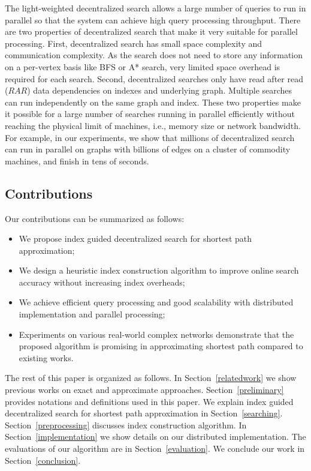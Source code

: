 The light-weighted decentralized search allows a large number of queries to run in parallel so that the system can achieve high query processing throughput. There are two properties of decentralized search that make it very suitable for parallel processing. First, decentralized search has small space complexity and communication complexity. As the search does not need to store any information on a per-vertex basis like BFS or A* search, very limited space overhead is required for each search. Second, decentralized searches only have read after read ($RAR$) data dependencies on indexes and underlying graph. Multiple searches can run independently on the same graph and index. These two properties make it possible for a large number of searches running in parallel efficiently without reaching the physical limit of machines, i.e., memory size or network bandwidth. For example, in our experiments, we show that millions of decentralized search can run in parallel on graphs with billions of edges on a cluster of commodity machines, and finish in tens of seconds.

\subsection{Contributions}
Our contributions can be summarized as follows:

\begin{itemize}
	\item We propose index guided decentralized search for shortest path approximation;
	\item We design a heuristic index construction algorithm to improve online search accuracy without increasing index overheads;
	\item We achieve efficient query processing and good scalability with distributed implementation and parallel processing;
	\item Experiments on various real-world complex networks demonstrate that the proposed algorithm is promising in approximating shortest path compared to existing works.
\end{itemize}

The rest of this paper is organized as follows. In Section~\ref{relatedwork} we show previous works on exact and approximate approaches. Section~\ref{preliminary} provides notations and definitions used in this paper. We explain index guided decentralized search for shortest path approximation in Section~\ref{searching}. Section~\ref{preprocessing} discusses index construction algorithm. In Section~\ref{implementation} we show details on our distributed implementation. The evaluations of our algorithm are in Section~\ref{evaluation}. We conclude our work in Section~\ref{conclusion}.
